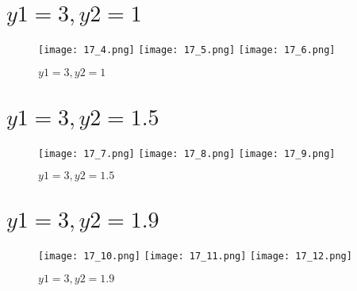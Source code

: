 \documentclass{article}
\begin{document}
\section{$y1 = 3, y2 = 1$}
\begin{figure}[!h]
    \centering
    \texttt{[image: 17\_4.png]}
    \texttt{[image: 17\_5.png]}
    \texttt{[image: 17\_6.png]}
    \caption{$y1 = 3, y2 = 1$}
\end{figure}

\section{$y1 = 3, y2 = 1.5$}
\begin{figure}[!h]
    \centering
    \texttt{[image: 17\_7.png]}
    \texttt{[image: 17\_8.png]}
    \texttt{[image: 17\_9.png]}
    \caption{$y1 = 3, y2 = 1.5$}
\end{figure}

\section{$y1 = 3, y2 = 1.9$}
\begin{figure}[!h]
    \centering
    \texttt{[image: 17\_10.png]}
    \texttt{[image: 17\_11.png]}
    \texttt{[image: 17\_12.png]}
    \caption{$y1 = 3, y2 = 1.9$}
\end{figure}
\end{document}
